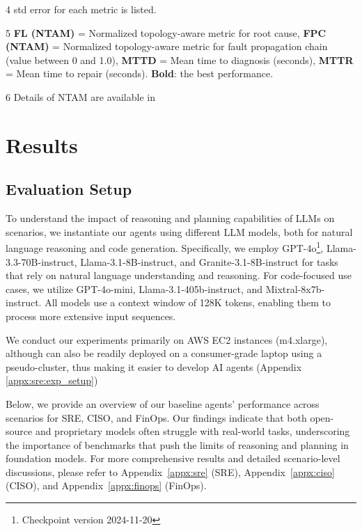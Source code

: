 \begin{table*}[h]
\begin{threeparttable}
\begin{tablenotes}
    \item[4] std error for each metric is listed.
    \item[5] \textbf{FL (NTAM)} = Normalized topology-aware metric for root cause, 
          \textbf{FPC (NTAM)} = Normalized topology-aware metric for fault propagation chain (value between 0 and 1.0), 
          \textbf{MTTD} = Mean time to diagnosis (seconds), 
          \textbf{MTTR} = Mean time to repair (seconds). \textbf{Bold}: the best performance.
    \item[6] Details of NTAM are available in 
  \end{tablenotes}
\end{threeparttable}
\end{table*}

\section{Results}
\label{sec:results}

\subsection{Evaluation Setup}
 

To understand the impact of reasoning and planning capabilities of LLMs on \bench scenarios, we instantiate our agents using different LLM models, both for natural language reasoning and code generation. 
Specifically, we employ GPT-4o\footnote{Checkpoint version 2024-11-20}, Llama-3.3-70B-instruct, Llama-3.1-8B-instruct, and Granite-3.1-8B-instruct for tasks that rely on natural language understanding and reasoning. For code-focused use cases, we utilize GPT-4o-mini, Llama-3.1-405b-instruct, and Mixtral-8x7b-instruct. 
All models use a context window of 128K tokens, enabling them to process more extensive input sequences.

We conduct our experiments primarily on AWS EC2 instances (m4.xlarge), although \bench can also be readily deployed on a consumer-grade laptop using a pseudo-cluster, thus making it easier to develop AI agents (Appendix \ref{appx:sre:exp_setup})

Below, we provide an overview of our baseline agents’ performance across \bench scenarios for SRE, CISO, and FinOps. Our findings indicate that both open-source and proprietary models often struggle with real-world tasks, underscoring the importance of benchmarks that push the limits of reasoning and planning in foundation models. For more comprehensive results and detailed scenario-level discussions, please refer to Appendix~\ref{appx:sre} (SRE), Appendix~\ref{appx:ciso} (CISO), and Appendix~\ref{appx:finops} (FinOps).

